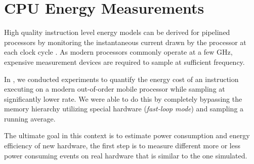 \section{CPU Energy Measurements}

High quality instruction level energy models can be derived for pipelined
processors by monitoring the instantaneous current drawn by the processor at
each clock cycle \cite{nikolaidis2005instruction}. As modern processors commonly
operate at a few GHz, expensive measurement devices are required to sample
at sufficient frequency. 

In \cite{rundehvatum2013exploring}, we conducted experiments to quantify the
energy cost of an instruction executing on a modern out-of-order mobile
processor while sampling at significantly lower rate. We were able to do this by
completely bypassing the memory hierarchy utilizing special hardware
(\emph{fast-loop mode}) and sampling a running average.

The ultimate goal in this context is to estimate power consumption and energy
efficiency of new hardware, the first step is to measure different more or less
power consuming events on real hardware that is similar to the one simulated.

